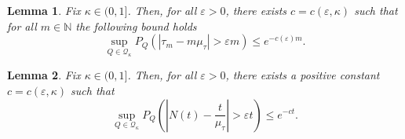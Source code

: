 \documentclass[10pt,a4paper]{amsart}
\newtheorem{lemma}{Lemma}
\newcommand{\mutau}{\mu_{\tau}}
\begin{document}
\begin{lemma}
\label{l:tau_ld_bound}
Fix $\kappa \in (0,1]$. Then, for all $\varepsilon > 0$, there exists $c = c(\varepsilon, \kappa)$ such that for all $m \in \mathbb{N}$ the following bound holds
    \begin{equation}
       \sup_{Q\in \mathcal{Q}_\kappa} P_Q \left(
                \left|
                    \tau_m - m \mutau
                \right|
                    >
                \varepsilon m
            \right)
            \leq
        e^{-c(\varepsilon) m}.
    \end{equation}  
\end{lemma}

\begin{lemma}
    \label{l:N_ld_bound} Fix $\kappa \in (0,1]$. Then, for all $\varepsilon >0$, there exists a positive constant $c = c(\varepsilon,\kappa)$ such that
    \begin{equation}
       \sup_{Q\in \mathcal{Q}_\kappa} P_Q \left(
                \left|
                    N(t) - \frac{t}{\mutau}
                \right|
                    >
                \varepsilon t
            \right)
            \leq
        e^{- c t}.
    \end{equation}  
\end{lemma}
\end{document}
